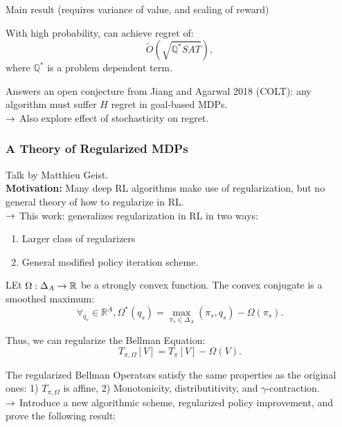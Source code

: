 Main result (requires variance of value, and scaling of reward)
\begin{theorem}
With high probability, can achieve regret of:
\[
\tilde{O}(\sqrt{\mathbb{Q}^*SAT}),
\]
where $\mathbb{Q}^*$ is a problem dependent term.
\end{theorem}

Answers an open conjecture from Jiang and Agarwal 2018 (COLT): any algorithm must suffer $H$ regret in goal-based MDPs. \\

$\rightarrow$ Also explore effect of stochasticity on regret. \\

\spacerule

\subsubsection{A Theory of Regularized MDPs~\cite{geist2019theory}}

Talk by Matthieu Geist. \\

{\bf Motivation:} Many deep RL algorithms make use of regularization, but no general theory of how to regularize in RL. \\

$\rightarrow$ This work: generalizes regularization in RL in two ways:
\begin{enumerate}
    \item Larger class of regularizers
    \item General modified policy iteration scheme.
\end{enumerate}

LEt $\Omega : \Delta_A \rightarrow \mathbb{R}$ be a strongly convex function. The convex conjugate is a smoothed maximum:
\[
\forall_{q_s} \in \mathbb{R}^A, \Omega^*(q_s) = \max_{\pi_s \in \Delta_A} (\pi_s, q_s) - \Omega(\pi_s).
\]

Thus, we can regularize the Bellman Equation:
\begin{equation}
    T_{\pi,\Omega}[V] = T_\pi[V] - \Omega(V).
\end{equation}

The regularized Bellman Operators satisfy the same properties as the original ones: 1) $T_{\pi, \Omega}$ is affine, 2) Monotonicity, distributitivity, and $\gamma$-contraction. \\

$\rightarrow$ Introduce a new algorithmic scheme, regularized policy improvement, and prove the following result:

